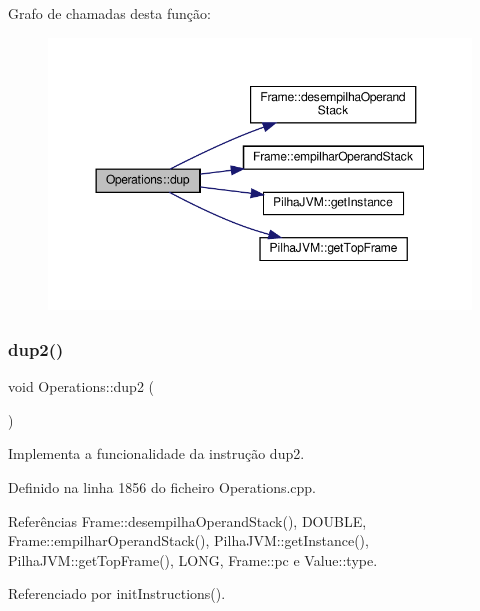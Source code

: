 Grafo de chamadas desta função\+:\nopagebreak
\begin{figure}[H]
\begin{center}
\leavevmode
\includegraphics[width=350pt]{classOperations_a0cba4ff895f2e3908eea5b39305481a4_cgraph}
\end{center}
\end{figure}
\mbox{\label{classOperations_a7cb6985281b1ab32e905e4726ef2c964}} 
\subsubsection{\texorpdfstring{dup2()}{dup2()}}
{\footnotesize\ttfamily void Operations\+::dup2 (\begin{DoxyParamCaption}{ }\end{DoxyParamCaption})\hspace{0.3cm}{\ttfamily [private]}}



Implementa a funcionalidade da instrução dup2. 



Definido na linha 1856 do ficheiro Operations.\+cpp.



Referências Frame\+::desempilha\+Operand\+Stack(), D\+O\+U\+B\+LE, Frame\+::empilhar\+Operand\+Stack(), Pilha\+J\+V\+M\+::get\+Instance(), Pilha\+J\+V\+M\+::get\+Top\+Frame(), L\+O\+NG, Frame\+::pc e Value\+::type.



Referenciado por init\+Instructions().

